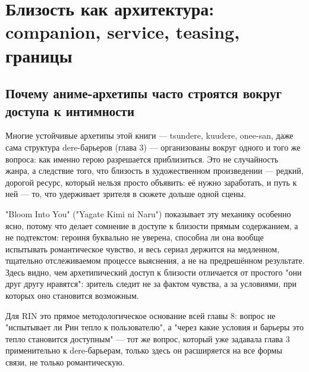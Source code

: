 \setcounter{chapter}{7}
\chapter{Близость как архитектура: companion, service, teasing, границы}

\section{Почему аниме-архетипы часто строятся вокруг доступа к интимности}

Многие устойчивые архетипы этой книги — tsundere, kuudere, onee-san, даже сама структура dere-барьеров (глава 3) — организованы вокруг одного и того же вопроса: как именно герою разрешается приблизиться. Это не случайность жанра, а следствие того, что близость в художественном произведении — редкий, дорогой ресурс, который нельзя просто объявить: её нужно заработать, и путь к ней — то, что удерживает зрителя в сюжете дольше одной сцены.

"Bloom Into You" ("Yagate Kimi ni Naru") показывает эту механику особенно ясно, потому что делает сомнение в доступе к близости прямым содержанием, а не подтекстом: героиня буквально не уверена, способна ли она вообще испытывать романтическое чувство, и весь сериал держится на медленном, тщательно отслеживаемом процессе выяснения, а не на предрешённом результате. Здесь видно, чем архетипический доступ к близости отличается от простого "они друг другу нравятся": зритель следит не за фактом чувства, а за условиями, при которых оно становится возможным.

Для RIN это прямое методологическое основание всей главы 8: вопрос не "испытывает ли Рин тепло к пользователю", а "через какие условия и барьеры это тепло становится доступным" — тот же вопрос, который уже задавала глава 3 применительно к dere-барьерам, только здесь он расширяется на все формы связи, не только романтическую.
